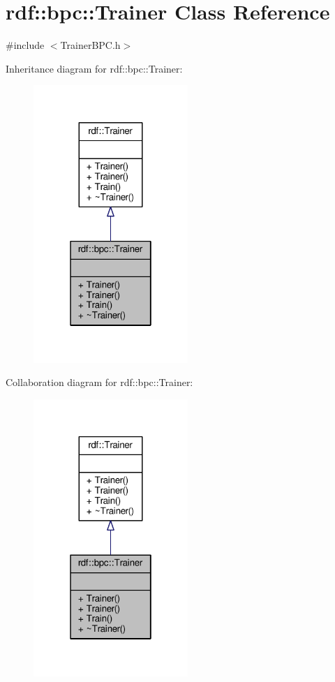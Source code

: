 \hypertarget{classrdf_1_1bpc_1_1Trainer}{}\section{rdf\+:\+:bpc\+:\+:Trainer Class Reference}
\label{classrdf_1_1bpc_1_1Trainer}


{\ttfamily \#include $<$Trainer\+B\+P\+C.\+h$>$}



Inheritance diagram for rdf\+:\+:bpc\+:\+:Trainer\+:
\nopagebreak
\begin{figure}[H]
\begin{center}
\leavevmode
\includegraphics[width=166pt]{classrdf_1_1bpc_1_1Trainer__inherit__graph}
\end{center}
\end{figure}


Collaboration diagram for rdf\+:\+:bpc\+:\+:Trainer\+:
\nopagebreak
\begin{figure}[H]
\begin{center}
\leavevmode
\includegraphics[width=166pt]{classrdf_1_1bpc_1_1Trainer__coll__graph}
\end{center}
\end{figure}
